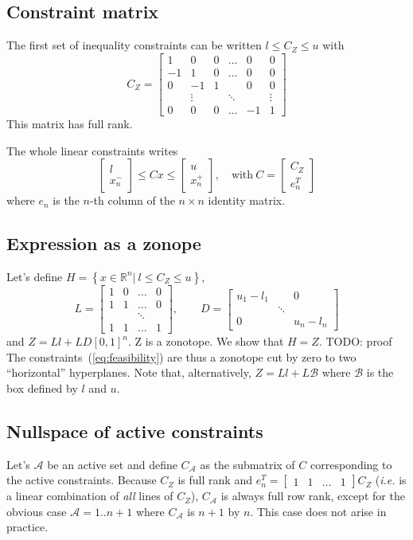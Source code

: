 \documentclass[]{article}
\newcommand{\BIN}{\begin{bmatrix}}
\newcommand{\BOUT}{\end{bmatrix}}
\begin{document}
\subsection{Constraint matrix}
The first set of inequality constraints can be written $l \leq C_Z \leq u$ with
\begin{equation}
  C_Z = \BIN  1 &  0 & 0 & \ldots &  0 & 0\\
             -1 &  1 & 0 & \ldots &  0 & 0\\
              0 & -1 & 1 &        &  0 & 0\\
                & \vdots &&\ddots &    & \vdots \\
              0 &  0 & 0 & \ldots & -1 & 1\BOUT 
\end{equation}
This matrix has full rank.

The whole linear constraints writes
\begin{equation}
  \BIN l \\ x_n^- \BOUT \leq C x \leq \BIN u \\ x_n^+ \BOUT, \quad \mbox{with}\ C = \BIN C_Z \\ e_n^T\BOUT
  \label{eq:feasibility}
\end{equation}
where $e_n$ is the $n$-th column of the $n\times n$ identity matrix.

\subsection{Expression as a zonope}
Let's define $H = \left\{x \in \mathbb{R}^n \vert\ l \leq C_Z \leq u\right\}$, 
\begin{equation}
L = \BIN 1 & 0 & \ldots & 0 \\ 1 & 1 &\ldots & 0 \\ & & \ddots & \\ 1 & 1 &\ldots & 1\BOUT, \qquad D = \BIN u_1 - l_1 & & 0 \\ & \ddots & \\ 0 & & u_n - l_n\BOUT
\end{equation}
and $Z = Ll + LD \left[0,1\right]^n$. Z is a zonotope. We show that $H = Z$.\newline
TODO: proof
\newline
The constraints~(\ref{eq:feasibility}) are thus a zonotope cut by zero to two ``horizontal'' hyperplanes.
Note that, alternatively, $Z = Ll + L \mathcal{B}$ where $\mathcal{B}$ is the box defined by $l$ and $u$.

\subsection{Nullspace of active constraints}
Let's $\mathcal{A}$ be an active set and define $C_\mathcal{A}$ as the submatrix of $C$ corresponding to the active constraints.
Because $C_Z$ is full rank and $e_n^T = \BIN 1 & 1 & \ldots & 1 \BOUT C_Z$ (\emph{i.e.} is a linear combination of \emph{all} lines of $C_Z$), $C_\mathcal{A}$ is always full row rank, except for the obvious case $\mathcal{A} = 1..n+1$ where $C_\mathcal{A}$ is $n+1$ by $n$. This case does not arise in practice.
\end{document}
